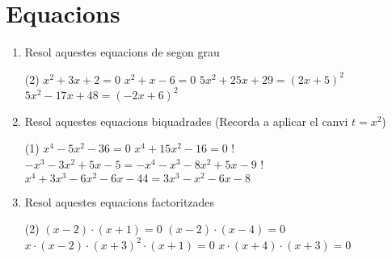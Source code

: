 \documentclass[a4paper]{article},
\begin{document}
  \section{Equacions}
      \begin{enumerate}[resume]
    \item Resol aquestes equacions de segon grau
    \begin{tasks}(2)
      \task $ x^{2} + 3 x + 2 =0$
      \task $ x^{2} +  x -6 =0$
      \task $5 x^{2} + 25 x + 29 =\left(2 x + 5\right)^2$
      \task $5 x^{2} -17 x + 48 =\left(-2 x + 6\right)^2$
    \end{tasks}
    \item Resol aquestes equacions biquadrades (Recorda a aplicar el canvi $t=x^2$)
    \begin{tasks}(1)
      \task $ x^{4}  -5 x^{2}  -36 =0$
      \task $ x^{4}  + 15 x^{2}  -16 =0$
      \task! $- x^{3} -3 x^{2} + 5 x -5 =- x^{4} - x^{3} -8 x^{2} + 5 x -9$
      \task! $ x^{4} + 3 x^{3} -6 x^{2} -6 x -44 =3 x^{3} - x^{2} -6 x -8$
    \end{tasks}
    \item Resol aquestes equacions factoritzades
    \begin{tasks}(2)
      \task $\left( x -2\right) \cdot \left( x  + 1\right) =0$
      \task $\left( x -2\right) \cdot \left( x -4\right) =0$
      \task $ x  \cdot \left( x -2\right) \cdot \left( x  + 3\right)^{2} \cdot \left( x  + 1\right) =0$
      \task $ x  \cdot \left( x  + 4\right) \cdot \left( x  + 3\right) =0$
    \end{tasks}
\par \noindent \vspace{0.25cm} 
\vspace{0.25cm}



\end{enumerate}
\end{document}
